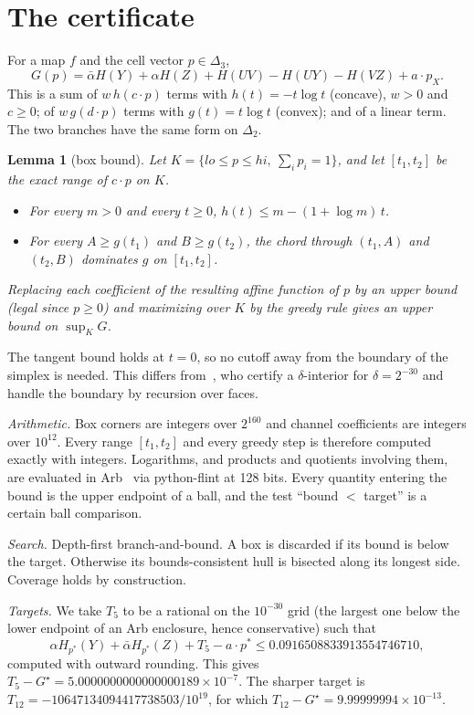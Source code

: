 \documentclass[11pt,draftclsnofoot,onecolumn,journal]{IEEEtran}
\newtheorem{lemma}{Lemma}
\newcommand{\ab}{\bar\alpha}
\begin{document}
\section{The certificate}

For a map $f$ and the cell vector $p\in\Delta_3$,
\[
G(p)=\ab H(Y)+\alpha H(Z)+H(UV)-H(UY)-H(VZ)+a\cdot p_X .
\]
This is a sum of $w\,h(c\cdot p)$ terms with $h(t)=-t\log t$ (concave), $w>0$ and $c\ge0$; of
$w\,g(d\cdot p)$ terms with $g(t)=t\log t$ (convex); and of a linear term. The two branches have the
same form on $\Delta_2$.

\begin{lemma}[box bound]\label{lem:box}
Let $K=\{lo\le p\le hi,\ \sum_ip_i=1\}$, and let $[t_1,t_2]$ be the exact range of $c\cdot p$ on $K$.
\begin{itemize}
\item For every $m>0$ and every $t\ge0$, $h(t)\le m-(1+\log m)\,t$.
\item For every $A\ge g(t_1)$ and $B\ge g(t_2)$, the chord through $(t_1,A)$ and $(t_2,B)$ dominates $g$ on $[t_1,t_2]$.
\end{itemize}
Replacing each coefficient of the resulting affine function of $p$ by an upper bound (legal since
$p\ge0$) and maximizing over $K$ by the greedy rule gives an upper bound on $\sup_KG$.
\end{lemma}

The tangent bound holds at $t=0$, so no cutoff away from the boundary of the simplex is needed.
This differs from~\cite{HLL}, who certify a $\delta$-interior for $\delta=2^{-30}$ and handle the
boundary by recursion over faces.

\emph{Arithmetic.} Box corners are integers over $2^{160}$ and channel coefficients are integers
over $10^{12}$. Every range $[t_1,t_2]$ and every greedy step is therefore computed exactly with
integers. Logarithms, and products and quotients involving them, are evaluated in Arb~\cite{Arb}
via python-flint at 128 bits. Every quantity entering the bound is the upper endpoint of a ball,
and the test ``bound $<$ target'' is a certain ball comparison.

\emph{Search.} Depth-first branch-and-bound. A box is discarded if its bound is below the target.
Otherwise its bounds-consistent hull is bisected along its longest side. Coverage holds by
construction.

\emph{Targets.} We take $T_5$ to be a rational on the $10^{-30}$ grid (the largest one below
the lower endpoint of an Arb enclosure, hence conservative) such that
\[\alpha H_{p^*}(Y)+\ab H_{p^*}(Z)+T_5-a\cdot p^*\le 0.0916508833913554746710,\]
computed with outward rounding. This gives $T_5-G^\star=5.0000000000000000189\times10^{-7}$. The sharper target is
$T_{12}=-10647134094417738503/10^{19}$, for which $T_{12}-G^\star=9.99999994\times10^{-13}$.
\end{document}
